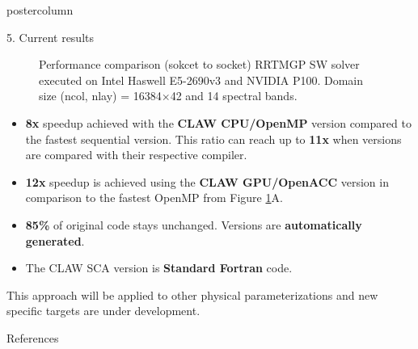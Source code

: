 \documentclass{beamer}
\begin{document}
\begin{frame}
\begin{columns}
\begin{column}{.38\textwidth}
\begin{beamercolorbox}[center]{postercolumn}
\begin{minipage}{.98\textwidth}
{\begin{myblock}{5. Current results}
\begin{figure}[ht]
  \caption[Performance comparison RRTMGP SW solver]{Performance comparison
  (sokcet to socket) RRTMGP SW solver executed on Intel Haswell E5-2690v3 and
  NVIDIA P100. Domain size (ncol, nlay) = 16384$\times$42 and 14 spectral bands.
  }
  \label{fig:perf_sw}
\end{figure}

\begin{itemize}
  \item \textbf{8x} speedup achieved with the \textbf{CLAW CPU/OpenMP} version
        compared to the fastest sequential version. This ratio can reach up to
        \textbf{11x} when versions are compared with their respective compiler.
  \item \textbf{12x} speedup is achieved using the \textbf{CLAW GPU/OpenACC}
        version in comparison to the fastest OpenMP from
        Figure \ref{fig:perf_sw}A.
  \item \textbf{85\%} of original code stays unchanged. Versions are
        \textbf{automatically generated}.
  \item The CLAW SCA version is \textbf{Standard Fortran} code.
\end{itemize}

This approach will be applied to other physical parameterizations and new
specific targets are under development.

\end{myblock}%

%
%
\begin{myblock}{References}
\footnotesize


\end{myblock}\vfill







}\end{minipage}\end{beamercolorbox}
\end{column}
\end{columns}
\end{frame}
\end{document}
